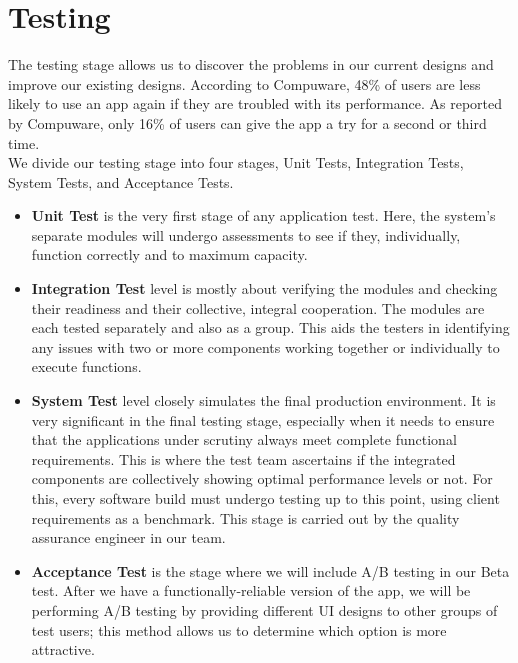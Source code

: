 \section{Testing}
The testing stage allows us to discover the problems in our current designs and improve our existing designs. 
According to Compuware, 48\% of users are less likely to use an app again if they are troubled with its performance.
As reported by Compuware, only 16\% of users can give the app a try for a second or third time. 
\\
We divide our testing stage into four stages, Unit Tests, Integration Tests, System Tests, and Acceptance Tests.
\begin{itemize}
\item\textbf{Unit Test} is the very first stage of any application test. Here, the system’s separate modules will undergo assessments to see if they, individually, function correctly and to maximum capacity. 
\item\textbf{Integration Test} level is mostly about verifying the modules and checking their readiness and their collective, integral cooperation. The modules are each tested separately and also as a group. This aids the testers in identifying any issues with two or more components working together or individually to execute functions.
\item\textbf{System Test} level closely simulates the final production environment. It is very significant in the final testing stage, especially when it needs to ensure that the applications under scrutiny always meet complete functional requirements. 
This is where the test team ascertains if the integrated components are collectively showing optimal performance levels or not. For this, every software build must undergo testing up to this point, using client requirements as a benchmark. 
This stage is carried out by the quality assurance engineer in our team.
\item\textbf{Acceptance Test} is the stage where we will include A/B testing in our Beta test. After we have a functionally-reliable version of the app, 
we will be performing A/B testing by providing different UI designs to other groups of test users; this method allows us to 
determine which option is more attractive.
\end{itemize}


